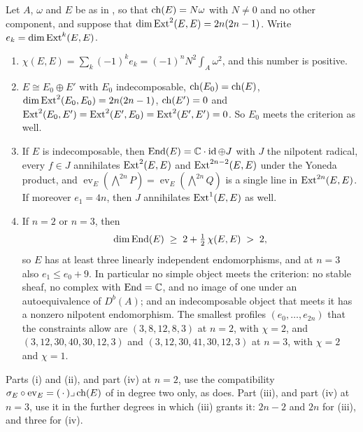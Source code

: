 \begin{theorem}
\label{thm:p2endo}
Let $A$, $\omega$ and $E$ be as in , so that
$\operatorname{ch}(E)=N\omega$ with $N\ne0$ and no other component, and suppose that
$\dim\operatorname{Ext}^{2}(E,E)=2n(2n-1)$. Write $e_{k}=\dim\operatorname{Ext}^{k}(E,E)$.
\begin{enumerate}[label=\textup{(\roman*)},leftmargin=2.6em,itemsep=2pt]
\item $\chi(E,E)=\sum_{k}(-1)^{k}e_{k}=(-1)^{n}N^{2}\int_{A}\omega^{2}$, and
  this number is positive.
\item $E\cong E_{0}\oplus E'$ with $E_{0}$ indecomposable,
  $\operatorname{ch}(E_{0})=\operatorname{ch}(E)$, $\dim\operatorname{Ext}^{2}(E_{0},E_{0})=2n(2n-1)$, $\operatorname{ch}(E')=0$ and
  $\operatorname{Ext}^{2}(E_{0},E')=\operatorname{Ext}^{2}(E',E_{0})=\operatorname{Ext}^{2}(E',E')=0$. So $E_{0}$ meets
  the criterion as well.
\item If $E$ is indecomposable, then $\operatorname{End}(E)=\mathbb{C}\cdot\operatorname{id}\oplus J$ with $J$
  the nilpotent radical, every $f\in J$ annihilates $\operatorname{Ext}^{2}(E,E)$ and
  $\operatorname{Ext}^{2n-2}(E,E)$ under the Yoneda product, and
  $\operatorname{ev}_{E}(\bigwedge^{2n}P)=\operatorname{ev}_{E}(\bigwedge^{2n}Q)$
  is a single line in $\operatorname{Ext}^{2n}(E,E)$. If moreover $e_{1}=4n$, then $J$
  annihilates $\operatorname{Ext}^{1}(E,E)$ as well.
\item If $n=2$ or $n=3$, then
  \[
    \dim\operatorname{End}(E)\;\ge\;2+\tfrac12\,\chi(E,E)\;>\;2,
  \]
  so $E$ has at least three linearly independent endomorphisms, and at
  $n=3$ also $e_{1}\le e_{0}+9$. In particular no simple object meets the
  criterion: no stable sheaf, no complex with $\operatorname{End}=\mathbb{C}$, and no image of one
  under an autoequivalence of $D^{b}(A)$; and an indecomposable object that
  meets it has a nonzero nilpotent endomorphism. The smallest profiles
  $(e_{0},\dots,e_{2n})$ that the constraints allow are $(3,8,12,8,3)$ at
  $n=2$, with $\chi=2$, and $(3,12,30,40,30,12,3)$ and $(3,12,30,41,30,12,3)$
  at $n=3$, with $\chi=2$ and $\chi=1$.
\end{enumerate}
Parts (i) and (ii), and part (iv) at $n=2$, use the compatibility
$\sigma_{E}\circ\operatorname{ev}_{E}=(\,\cdot\,)\lrcorner\operatorname{ch}(E)$ of
 in degree two only, as  does. Part
(iii), and part (iv) at $n=3$, use it in the further degrees in which
(iii) grants it: $2n-2$ and $2n$ for (iii), and three for
(iv).
\end{theorem}

